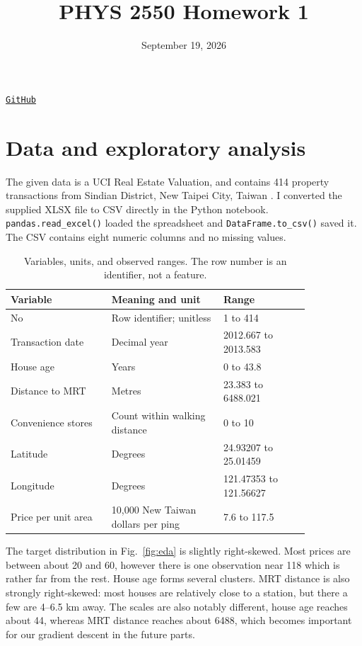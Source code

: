 \documentclass[11pt]{article}
\title{\vspace{-1.6em}\textbf{PHYS 2550 Homework 1}}
\author{\studentname}
\date{September 19, 2026}
\begin{document}
\maketitle
\vspace{-1.7em}
\begin{center}
 \href{https://github.com/beusy/applied-machine-learning-in-physics}{\texttt{GitHub}}
\end{center}

\section{Data and exploratory analysis}

The given data is a UCI Real Estate Valuation, and contains 414 property
transactions from Sindian District, New Taipei City, Taiwan \cite{uci}. I converted
the supplied XLSX file to CSV directly in the Python notebook. \texttt{pandas.read\_excel()} loaded the
spreadsheet and \texttt{DataFrame.to\_csv()} saved it. The
CSV contains eight numeric columns and no missing values.

\begin{table}[H]
\centering
\caption{Variables, units, and observed ranges. The row number is an identifier, not
a feature.}
\small
\begin{tabular}{@{}p{0.29\linewidth}p{0.31\linewidth}p{0.24\linewidth}@{}}
\toprule
Variable & Meaning and unit & Range \\
\midrule
No & Row identifier; unitless & 1 to 414 \\
Transaction date & Decimal year & 2012.667 to 2013.583 \\
House age & Years & 0 to 43.8 \\
Distance to MRT & Metres & 23.383 to 6488.021 \\
Convenience stores & Count within walking distance & 0 to 10 \\
Latitude & Degrees & 24.93207 to 25.01459 \\
Longitude & Degrees & 121.47353 to 121.56627 \\
Price per unit area & 10,000 New Taiwan dollars per ping & 7.6 to 117.5 \\
\bottomrule
\end{tabular}
\end{table}

The target distribution in Fig.~\ref{fig:eda} is slightly right-skewed. Most prices are
between about 20 and 60, however there is one observation near 118 which is rather far from the rest. House
age forms several clusters. MRT distance is also strongly right-skewed: most houses
are relatively close to a station, but there a few are 4--6.5 km away. The scales are also
notably different, house age reaches about 44, whereas MRT distance reaches about
6488, which becomes important for our gradient descent in the future parts.
\end{document}
